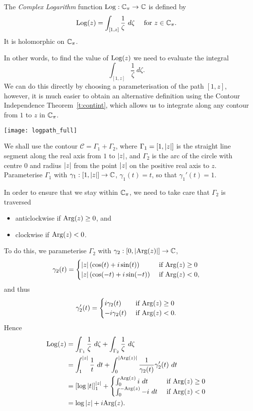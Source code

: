 \begin{definition}
The \emph{Complex Logarithm} function $\operatorname{Log} : \mathbb{C}_{\pi} \to \mathbb{C}$ is defined by
\[
\operatorname{Log} (z) = \int_{[1,z]} \frac{1}{\zeta}\ d \zeta\quad \text{ for } z \in \mathbb{C}_{\pi}.
\]
It is holomorphic on $\mathbb{C}_{\pi}$.
\end{definition}
In other words, to find the value of $\operatorname{Log} (z)$ we need to evaluate the integral
\[
\int_{[1,z]} \frac{1}{\zeta}\ d \zeta.
\]
We can do this directly by choosing a parameterisation of the path $[1,z]$, however, it is much easier to obtain an alternative definition using the Contour Independence Theorem~\ref{t:contint}, which allows us to integrate along any contour from $1$ to $z$ in $\mathbb{C}_{\pi}$.
\begin{center}
\texttt{[image: logpath\_full]}
\end{center}
We shall use the contour $\mathcal{C}=\Gamma_1+\Gamma_2$, where $\Gamma_1=[1,\left| z \right|]$ is the straight line segment along the real axis from $1$ to $\left| z \right|$, and $\Gamma_2$ is the arc of the circle with centre $0$ and radius $\left| z \right|$ from the point $\left| z \right|$ on the positive real axis to $z$. Parameterise $\Gamma_1$ with $\gamma_1:[1,\left| z \right|] \to \mathbb{C}$, $\gamma_1(t)=t$, so that $\gamma_1'(t)=1$.

 In order to ensure that we stay within $\mathbb{C}_{\pi}$, we need to take care that $\Gamma_2$ is traversed
\begin{itemize}
\item anticlockwise if $\mathrm{Arg} (z) \geq 0$, and
\item clockwise if $\mathrm{Arg}(z)<0$.
\end{itemize}
To do this, we parameterise $\Gamma_2$ with $\gamma_2:[0, \left| \mathrm{Arg}(z) \right|] \to \mathbb{C}$, 
\[\gamma_2(t) = \begin{cases}
\left| z \right| \left( \cos (t) + i \sin (t) \right) & \text{ if } \mathrm{Arg}(z) \geq 0 \\
\left| z \right| \left( \cos (-t) + i \sin (-t) \right) & \text{ if } \mathrm{Arg}(z)<0,
\end{cases}
\]
and thus
\[
\gamma_2'(t) = \begin{cases}
 i \gamma_2 (t) & \text{ if } \mathrm{Arg}(z) \geq 0 \\
 -i \gamma_2 (t) & \text{ if } \mathrm{Arg} (z)<0.
\end{cases}
\]
Hence
\begin{align*}
\operatorname{Log} (z) & = \int_{\Gamma_1} \frac{1}{\zeta}\ d\zeta + \int_{\Gamma_2} \frac{1}{\zeta}\ d\zeta \\
& = 
\int_{1}^{\left| z \right|} \frac{1}{t}\ dt + \int_0^{\left| \mathrm{Arg} (z) \right|} \frac{1}{\gamma_2(t)} \gamma_2'(t)\ dt \\
& = \left[ \log \left| t \right| \right]_1^{\left| z \right|} + 
\begin{cases}
\int_0^{\mathrm{Arg} (z)} i\ dt & \text{ if } \mathrm{Arg} (z) \geq 0 \\
\int_0^{-\mathrm{Arg}(z)} -i\ dt & \text{ if } \mathrm{Arg} (z) < 0 
\end{cases}
\\
& = \log \left| z \right| + i \mathrm{Arg} (z).
\end{align*}

